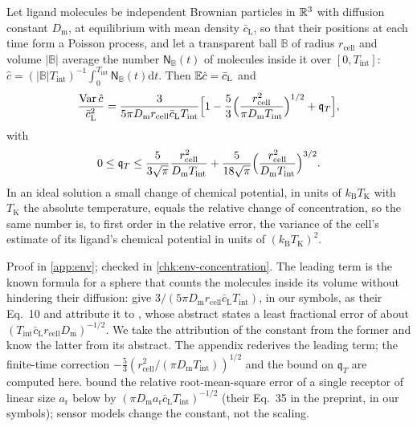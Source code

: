 \begin{proposition}\label{prop:env-concentration}
Let ligand molecules be independent Brownian particles in $\mathbb{R}^3$ with diffusion constant $D_{\mathrm m}$, at equilibrium with mean density $\bar c_{\mathrm L}$, so that their positions at each time form a Poisson process, and let a transparent ball $\mathbb B$ of radius $r_{\mathrm{cell}}$ and volume $\lvert\mathbb B\rvert$ average the number $\mathsf N_{\mathbb B}(t)$ of molecules inside it over $[0,T_{\mathrm{int}}]$: $\hat c=(\lvert\mathbb B\rvert T_{\mathrm{int}})^{-1}\int_0^{T_{\mathrm{int}}}\mathsf N_{\mathbb B}(t)\mathrm dt$. Then $\mathbb{E}\hat c=\bar c_{\mathrm L}$ and
\[
\frac{\operatorname{Var}\hat c}{\bar c_{\mathrm L}^2}=\frac{3}{5\pi D_{\mathrm m}r_{\mathrm{cell}}\bar c_{\mathrm L}T_{\mathrm{int}}}\Bigl[1-\frac53\Bigl(\frac{r_{\mathrm{cell}}^2}{\pi D_{\mathrm m}T_{\mathrm{int}}}\Bigr)^{1/2}+\mathfrak q_T\Bigr],
\]
with
\[
0\le\mathfrak q_T\le\frac{5}{3\sqrt\pi}\frac{r_{\mathrm{cell}}^2}{D_{\mathrm m}T_{\mathrm{int}}}+\frac{5}{18\sqrt\pi}\Bigl(\frac{r_{\mathrm{cell}}^2}{D_{\mathrm m}T_{\mathrm{int}}}\Bigr)^{3/2}.
\]
In an ideal solution a small change of chemical potential, in units of $k_{\mathrm B}T_{\mathrm K}$ with $T_{\mathrm K}$ the absolute temperature, equals the relative change of concentration, so the same number is, to first order in the relative error, the variance of the cell's estimate of its ligand's chemical potential in units of $(k_{\mathrm B}T_{\mathrm K})^2$.
\end{proposition}

Proof in \cref{app:env}; checked in \cref{chk:env-concentration}. The leading term is the known formula for a sphere that counts the molecules inside its volume without hindering their diffusion: \citet{mora2010limits} give $3/(5\pi D_{\mathrm m}r_{\mathrm{cell}}\bar c_{\mathrm L}T_{\mathrm{int}})$, in our symbols, as their Eq.~10 and attribute it to \citet{berg1977physics}, whose abstract states a least fractional error of about $(T_{\mathrm{int}}\bar c_{\mathrm L}r_{\mathrm{cell}}D_{\mathrm m})^{-1/2}$. We take the attribution of the constant from the former and know the latter from its abstract. The appendix rederives the leading term; the finite-time correction $-\frac53(r_{\mathrm{cell}}^2/(\pi D_{\mathrm m}T_{\mathrm{int}}))^{1/2}$ and the bound on $\mathfrak q_T$ are computed here.  bound the relative root-mean-square error of a single receptor of linear size $a_{\mathrm r}$ below by $(\pi D_{\mathrm m}a_{\mathrm r}\bar c_{\mathrm L}T_{\mathrm{int}})^{-1/2}$ (their Eq.~35 in the preprint, in our symbols); sensor models change the constant, not the scaling.

